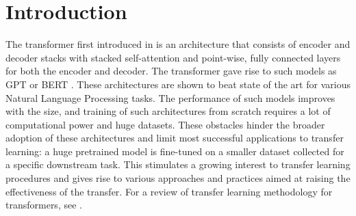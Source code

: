 \documentclass[review]{elsarticle}
\begin{document}
\section{Introduction}

The transformer first introduced in \cite{vaswani2017attention} is an architecture that consists of encoder and decoder stacks with stacked self-attention and point-wise, fully connected layers for both the encoder and decoder. The transformer gave rise to such models as GPT \cite{radford2018improving,radford2019language} or BERT \cite{devlin2019bert}. These architectures are shown to beat state of the art for various Natural Language Processing tasks. The performance of such models improves with the size, and training of such architectures from scratch requires a lot of computational power and huge datasets. These obstacles hinder the broader adoption of these architectures and limit most successful applications to transfer learning: a huge pretrained model is fine-tuned on a smaller dataset collected for a specific downstream task. This stimulates a growing interest to transfer learning procedures and gives rise to various approaches and practices aimed at raising the effectiveness of the transfer. For a review of transfer learning methodology for transformers, see  \cite{raffel2019exploring}. 
\end{document}
